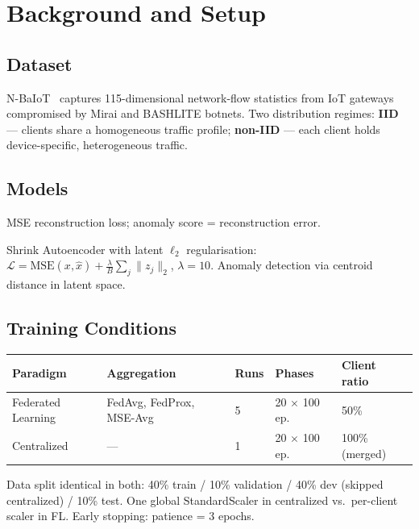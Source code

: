 \documentclass[11pt,a4paper]{article}
\begin{document}
\newpage
\section{Background and Setup}

\subsection{Dataset}
N-BaIoT~\cite{meidan2018nbaiot} captures 115-dimensional network-flow statistics
from IoT gateways compromised by Mirai and BASHLITE botnets.
Two distribution regimes:
\textbf{IID} — clients share a homogeneous traffic profile;
\textbf{non-IID} — each client holds device-specific, heterogeneous traffic.

\subsection{Models}

\begin{description}[leftmargin=1.8em]
  \item[Autoencoder (AE)] MSE reconstruction loss; anomaly score = reconstruction error.
  \item[Hybrid (SAE-CEN)] Shrink Autoencoder with latent $\ell_2$ regularisation:
    $\mathcal{L} = \mathrm{MSE}(x,\hat{x}) + \frac{\lambda}{B}\sum_{j}\|z_j\|_2$,
    $\lambda=10$. Anomaly detection via centroid distance in latent space.
\end{description}

\subsection{Training Conditions}

\begin{center}
\small
\begin{tabular}{lllll}
\toprule
\textbf{Paradigm} & \textbf{Aggregation} & \textbf{Runs} & \textbf{Phases} & \textbf{Client ratio} \\
\midrule
Federated Learning & FedAvg, FedProx, MSE-Avg & 5 & 20 $\times$ 100 ep. & 50\% \\
Centralized        & —                         & 1 & 20 $\times$ 100 ep. & 100\% (merged) \\
\bottomrule
\end{tabular}
\end{center}

Data split identical in both: 40\% train / 10\% validation / 40\% dev (skipped
centralized) / 10\% test. One global StandardScaler in centralized vs.\ per-client
scaler in FL. Early stopping: patience = 3 epochs.
\end{document}
